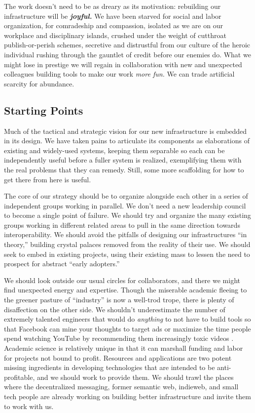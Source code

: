 The work doesn't need to be as dreary as its motivation: rebuilding our
infrastructure will be \textbf{\emph{joyful.}} We have been starved for
social and labor organization, for comradeship and compassion, isolated
as we are on our workplace and disciplinary islands, crushed under the
weight of cutthroat publish-or-perish schemes, secretive and distrustful
from our culture of the heroic individual rushing through the gauntlet
of credit before our enemies do. What we might lose in prestige we will
regain in collaboration with new and unexpected colleagues building
tools to make our work \emph{more fun.} We can trade artificial scarcity
for abundance.

\hypertarget{starting-points}{%
\subsection{Starting Points}\label{starting-points}}

Much of the tactical and strategic vision for our new infrastructure is
embedded in its design. We have taken pains to articulate its components
as elaborations of existing and widely-used systems, keeping them
separable so each can be independently useful before a fuller system is
realized, exemplifying them with the real problems that they can remedy.
Still, some more scaffolding for how to get there from here is useful.

The core of our strategy should be to organize alongside each other in a
series of independent groups working in parallel. We don't need a new
leadership council to become a single point of failure. We should try
and organize the many existing groups working in different related areas
to pull in the same direction towards interoperability. We should avoid
the pitfalls of designing our infrastructures ``in theory,'' building
crystal palaces removed from the reality of their use. We should seek to
embed in existing projects, using their existing mass to lessen the need
to prospect for abstract ``early adopters.''

We should look outside our usual circles for collaborators, and there we
might find unexpected energy and expertise. Though the miserable
academic fleeing to the greener pasture of ``industry'' is now a
well-trod trope, there is plenty of disaffection on the other side. We
shouldn't underestimate the number of extremely talented engineers that
would do \emph{anything} to not have to build tools so that Facebook can
mine your thoughts to target ads \citep{biddleFacebookWonSay2017} 
or maximize the time people spend watching YouTube by recommending them
increasingly toxic videos \citep{maackYouTubeRecommendationsAre2019} . Academic science is relatively unique in that it can marshall
funding and labor for projects not bound to profit. Resources and
applications are two potent missing ingredients in developing
technologies that are intended to be anti-profitable, and we should work
to provide them. We should trawl the places where the decentralized
messaging, former semantic web, indieweb, and small tech people are
already working on building better infrastructure and invite them to
work with us.

